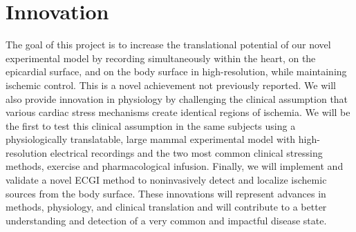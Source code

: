 %
\section{Innovation}
\label{sec:innov}

The goal of this project is to increase the
translational potential of our novel experimental model by recording
simultaneously within the heart, on the epicardial surface, and on the
body surface in high-resolution, while maintaining ischemic control. This
is a novel achievement not previously reported. We will also
provide innovation in physiology by challenging the clinical
assumption that various cardiac stress mechanisms create identical regions
of ischemia. We will be the first to test this clinical assumption in
the same subjects using a physiologically translatable,
large mammal experimental model with high-resolution electrical recordings and the two most common clinical
stressing methods, exercise and pharmacological infusion. Finally, we will
implement and validate a novel ECGI method to noninvasively detect and
localize ischemic sources from the body surface. These innovations will
represent advances in methods, physiology, and clinical translation and
will contribute to a better understanding and detection of a very common and impactful disease state.

